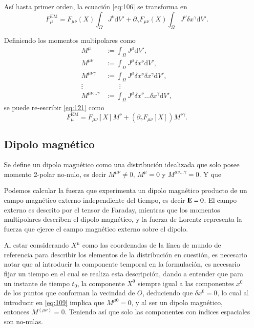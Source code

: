 Así hasta primer orden, la ecuación \eqref{eq:106} se transforma en
\begin{equation}
\label{eq:121}
F^{\mathrm{EM}}_{\mu} = F_{\mu \nu}(X) \int_{\Omega} J^{\nu} \mathrm{d}V' + \partial_{\gamma} F_{\mu \nu}(X) \int_{\Omega} J^{\nu} \delta x^{\gamma} \mathrm{d}V'.
\end{equation}

Definiendo los momentos multipolares como
\begin{align}
\label{eq:108}
M^{\mu} &:= \int_{\Omega} J^{\mu} \mathrm{d}V',\\
\label{eq:109}
M^{\mu \nu} &:= \int_{\Omega} J^{\mu} \delta x^{\nu} \mathrm{d}V',\\
M^{\mu \nu \gamma} &:= \int_{\Omega} J^{\mu} \delta x^{\nu} \delta x^{\gamma} \mathrm{d}V',\\
\vdots & \qquad \vdots \nonumber \\
M^{\mu \nu \dots \gamma} &:= \int_{\Omega} J^{\mu} \delta x^{\nu} \dots \delta x^{\gamma} \mathrm{d}V',
\end{align}
se puede re-escribir \eqref{eq:121} como
\begin{equation}
F^{\mathrm{EM}}_{\mu} = F_{\mu \nu}[X] M^{\nu} + \left( \partial_{\gamma} F_{\mu \nu}[X] \right) M^{\nu \gamma}.
\end{equation}


\subsection{Dipolo magnético}

Se define un dipolo magnético como una distribución idealizada que solo posee momento 2-polar no-nulo, es decir $M^{\mu \nu} \neq 0$, $M^{\mu} = 0$ y $M^{\mu \nu \dots \gamma} = 0$. Y que 

Podemos calcular la fuerza que experimenta un dipolo magnético producto de un campo magnético externo independiente del tiempo, es decir $\vb{E}=0$. El campo externo es descrito por el tensor de Faraday, mientras que los momentos multipolares describen el dipolo magnético, y la fuerza de Lorentz representa la fuerza que ejerce el campo magnético externo sobre el dipolo.

Al estar considerando $X^{\mu}$ como las coordenadas de la línea de mundo de referencia para describir los elementos de la distribución en cuestión, es necesario notar que al introducir la componente temporal en la formulación, es necesario fijar un tiempo en el cual se realiza esta descripción, dando a entender que para un instante de tiempo $t_0$, la componente $X^0$ siempre igual a las componentes $x^0$ de los puntos que conforman la vecindad de $O$, deduciendo que $\delta x^0 = 0$, lo cual al introducir en \eqref{eq:109} implica que $M^{\mu 0} = 0$, y al ser un dipolo magnético, entonces $M^{(\mu \nu)} = 0$. Teniendo así que solo las componentes con índices espaciales son no-nulas. 

